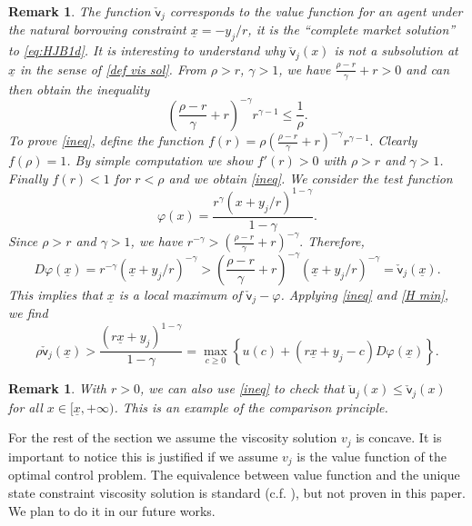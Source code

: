 \documentclass[11pt]{article}
\numberwithin{equation}{section}
\newtheorem{remark}[theorem]{Remark}
\theoremstyle{Claim}
\def\su{{\mathsf{u}}}
\def\sv{{\mathsf{v}}}
\newcommand{\ux}{{\underline x}}
\theoremstyle{plain}
\begin{document}
\begin{remark}
The function $\check{\sv}_j$ corresponds to the value function for an agent under the natural borrowing constraint $\underline{x} = -y_j/r$, it is the ``complete market solution'' to \cref{eq:HJB1d}.
It is interesting to understand why $\check{\sv}_j(x)$  is not a subsolution at $\ux$ in the sense of \cref{def vis sol}.  From $\rho > r$, $\gamma > 1$, we have  $\frac{\rho - r}{\gamma} + r > 0$ and can then obtain the inequality
\begin{equation}\label{ineq}
	\left( \frac{\rho - r}{\gamma} + r \right)^{-\gamma} r^{\gamma - 1} \leq \frac{1}{\rho}.
\end{equation}
To prove \eqref{ineq}, define the function
$
f(r) = \rho \left( \frac{\rho - r}{\gamma} + r \right)^{-\gamma} r^{\gamma - 1}.
$
Clearly $f(\rho)=1$. By simple computation we show $f'(r)>0$ with $\rho>r$ and $\gamma>1$. Finally $f(r)<1$ for $r<\rho$ and we obtain \eqref{ineq}. 
We consider the test function
$$
\varphi(x) = \frac{r^\gamma (x + y_j/r)^{1 - \gamma}}{1 - \gamma}.
$$
Since $\rho > r$ and $\gamma > 1$, we have
$
r^{-\gamma} > \left( \frac{\rho - r}{\gamma} + r \right)^{-\gamma}.
$
Therefore,
$$
D\varphi(\underline{x}) = r^{-\gamma} (\underline{x} + y_j/r)^{-\gamma} > \left( \frac{\rho - r}{\gamma} + r \right)^{-\gamma} (\underline{x} + y_j/r)^{-\gamma} = \check{\sv}_j(\underline{x}).
$$
This implies that $\underline{x}$ is a local maximum of $\check{\sv}_j- \varphi$. Applying \eqref{ineq} and \eqref{H min}, we find
$$
\rho \check{\sv}_j(\underline{x}) > \frac{(r\underline{x} + y_j)^{1 - \gamma}}{1 - \gamma} = \max_{c \ge 0} \left\{ u(c) + (r\underline{x} + y_j - c) D\varphi(\ux) \right\}.
$$
\end{remark}
\begin{remark}
With $r>0$, we can also use \cref{ineq} to check that 
$\check{\su}_j(x)\leq \check{\sv}_j(x)$ for all $x\in [\ux,+\infty)$. This is an example of the comparison principle. 
\end{remark}
For the rest of the section we assume the viscosity solution $v_j$ is concave. It is important to notice this is justified if we assume $v_j$ is the value function of the optimal control problem. The equivalence between value function and the unique state constraint viscosity solution is standard (c.f. \cite{Soner_1986}), but not proven in this paper. We plan to do it in our future works. 
\end{document}
